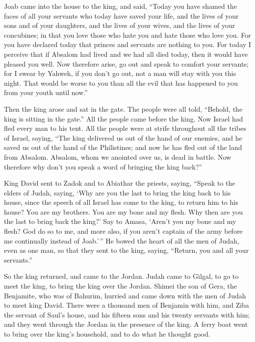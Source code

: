 Joab came into the house to the king, and said, ``Today
you have shamed the faces of all your servants who today have saved your
life, and the lives of your sons and of your daughters, and the lives of
your wives, and the lives of your concubines;  in that you
love those who hate you and hate those who love you. For you have
declared today that princes and servants are nothing to you. For today I
perceive that if Absalom had lived and we had all died today, then it
would have pleased you well.  Now therefore arise, go out
and speak to comfort your servants; for I swear by Yahweh, if you don't
go out, not a man will stay with you this night. That would be worse to
you than all the evil that has happened to you from your youth until
now.''

 Then the king arose and sat in the gate. The people were
all told, ``Behold, the king is sitting in the gate.'' All the people
came before the king. Now Israel had fled every man to his tent.
 All the people were at strife throughout all the tribes
of Israel, saying, ``The king delivered us out of the hand of our
enemies, and he saved us out of the hand of the Philistines; and now he
has fled out of the land from Absalom.  Absalom, whom we
anointed over us, is dead in battle. Now therefore why don't you speak a
word of bringing the king back?''

 King David sent to Zadok and to Abiathar the priests,
saying, ``Speak to the elders of Judah, saying, `Why are you the last to
bring the king back to his house, since the speech of all Israel has
come to the king, to return him to his house?  You are my
brothers. You are my bone and my flesh. Why then are you the last to
bring back the king?'  Say to Amasa, `Aren't you my bone
and my flesh? God do so to me, and more also, if you aren't captain of
the army before me continually instead of Joab.'\,''  He
bowed the heart of all the men of Judah, even as one man, so that they
sent to the king, saying, ``Return, you and all your servants.''

 So the king returned, and came to the Jordan. Judah came
to Gilgal, to go to meet the king, to bring the king over the Jordan.
 Shimei the son of Gera, the Benjamite, who was of
Bahurim, hurried and came down with the men of Judah to meet king David.
 There were a thousand men of Benjamin with him, and Ziba
the servant of Saul's house, and his fifteen sons and his twenty
servants with him; and they went through the Jordan in the presence of
the king.  A ferry boat went to bring over the king's
household, and to do what he thought good.

